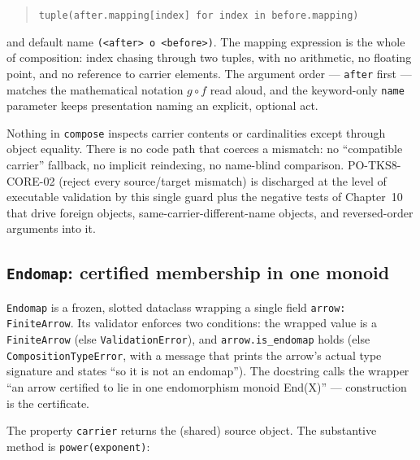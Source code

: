 \begin{quote}
\texttt{tuple(after.mapping[index] for index in before.mapping)}
\end{quote}

and default name \texttt{(<after> o <before>)}. The mapping expression is
the whole of composition: index chasing through two tuples, with no
arithmetic, no floating point, and no reference to carrier elements. The
argument order --- \texttt{after} first --- matches the mathematical
notation $g \circ f$ read aloud, and the keyword-only \texttt{name}
parameter keeps presentation naming an explicit, optional act.

\begin{remark}\label{ch09:rem:no-coercion}
Nothing in \texttt{compose} inspects carrier contents or cardinalities
except through object equality. There is no code path that coerces a
mismatch: no ``compatible carrier'' fallback, no implicit reindexing, no
name-blind comparison. PO-TKS8-CORE-02 (reject every source/target
mismatch) is discharged at the level of executable validation by this
single guard plus the negative tests of Chapter~10 that drive foreign
objects, same-carrier-different-name objects, and reversed-order arguments
into it.
\end{remark}

\subsection{\texttt{Endomap}: certified membership in one monoid}\label{ch09:sec:endomap}

\begin{construction}\label{ch09:con:endomap}
\texttt{Endomap} is a frozen, slotted dataclass wrapping a single field
\texttt{arrow: FiniteArrow}. Its validator enforces two conditions: the
wrapped value is a \texttt{FiniteArrow} (else \texttt{ValidationError}),
and \texttt{arrow.is\_endomap} holds (else \texttt{CompositionTypeError},
with a message that prints the arrow's actual type signature and states
``so it is not an endomap''). The docstring calls the wrapper ``an arrow
certified to lie in one endomorphism monoid End(X)'' --- construction is
the certificate.
\end{construction}

The property \texttt{carrier} returns the (shared) source object. The
substantive method is \texttt{power(exponent)}:

